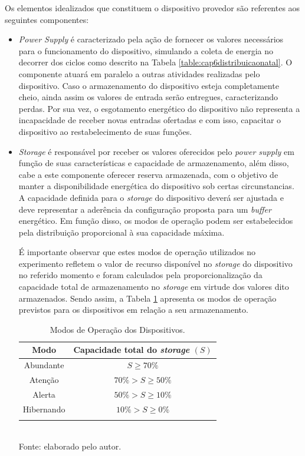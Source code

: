 Os elementos idealizados que constituem o dispositivo provedor são referentes aos seguintes componentes:
\begin{itemize}
	\item \textit{Power Supply} é caracterizado pela ação de fornecer os valores necessários para o funcionamento do dispositivo, simulando a coleta de energia no decorrer dos ciclos como descrito na Tabela \ref{table:cap6distribuicaonatal}. O componente atuará em paralelo a outras atividades realizadas pelo dispositivo. Caso o armazenamento do dispositivo esteja completamente cheio, ainda assim os valores de entrada serão entregues, caracterizando perdas. Por sua vez, o esgotamento energético do dispositivo não representa a incapacidade de receber novas entradas ofertadas e com isso, capacitar o dispositivo ao restabelecimento de suas funções.
	
	\item \textit{Storage} é responsável por receber os valores oferecidos pelo \textit{power supply} em função de suas características e capacidade de armazenamento, além disso, cabe a este componente oferecer reserva armazenada, com o objetivo de manter a disponibilidade energética do dispositivo sob certas circunstancias. A capacidade definida para o \textit{storage} do dispositivo deverá ser ajustada e deve representar a aderência da configuração proposta para um \textit{buffer} energético. Em função disso, os modos de operação podem ser estabelecidos pela distribuição proporcional à sua capacidade máxima.
	
	É importante observar que estes modos de operação utilizados no experimento refletem o valor de recurso disponível no \textit{storage} do dispositivo no referido momento e foram calculados pela proporcionalização da capacidade total de armazenamento no \textit{storage} em virtude dos valores dito armazenados. Sendo assim, a Tabela \ref{table:cap6:modos} apresenta os modos de operação previstos para os dispositivos em relação a seu armazenamento.
	
	
	\begingroup
	\begin{table}[htbp]
		
		\centering
		\caption{Modos de Operação dos Dispositivos.}
		\small
		\begin{tabular}{ |c | c |}
			\hline
			Modo &Capacidade total do \textit{storage} $ (S) $\\
			\hline
			Abundante & $S \ge 70\% $\\\hline
			Atenção & $70\% > S \ge 50\% $\\\hline
			Alerta & $ 50\% > S \ge 10\%$ \\\hline
			Hibernando & $10\% > S \ge 0\%$  \\ \hline\addlinespace[1pt]
		\end{tabular}
		\label{table:cap6:modos}
		\\
		\footnotesize Fonte: elaborado pelo autor.
		

\end{table}
\end{itemize}
